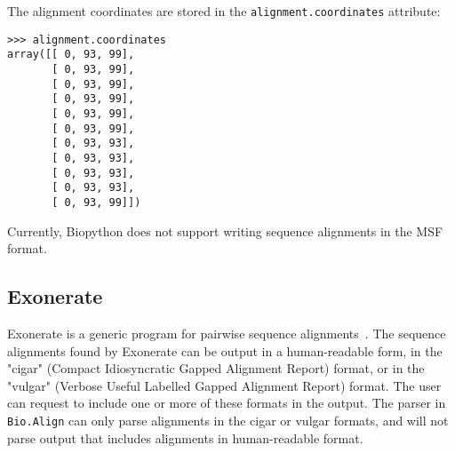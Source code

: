 The alignment coordinates are stored in the \verb|alignment.coordinates| attribute:
\begin{verbatim}
>>> alignment.coordinates
array([[ 0, 93, 99],
       [ 0, 93, 99],
       [ 0, 93, 99],
       [ 0, 93, 99],
       [ 0, 93, 99],
       [ 0, 93, 99],
       [ 0, 93, 93],
       [ 0, 93, 93],
       [ 0, 93, 93],
       [ 0, 93, 93],
       [ 0, 93, 99]])
\end{verbatim}
Currently, Biopython does not support writing sequence alignments in the MSF format.

\subsection{Exonerate}
\label{subsec:align_exonerate}

Exonerate is a generic program for pairwise sequence alignments~\cite{slater2005}. The sequence alignments found by Exonerate can be output in a human-readable form, in the "cigar" (Compact Idiosyncratic Gapped Alignment Report) format, or in the "vulgar" (Verbose Useful Labelled Gapped Alignment Report) format. The user can request to include one or more of these formats in the output. The parser in \verb|Bio.Align| can only parse alignments in the cigar or vulgar formats, and will not parse output that includes alignments in human-readable format.

